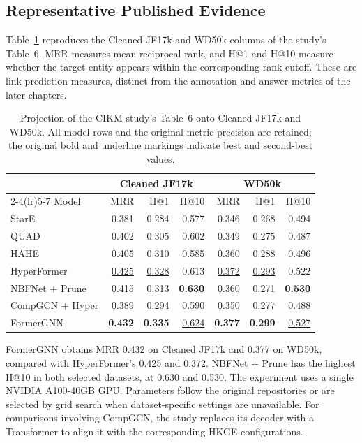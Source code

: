 \subsection{Representative Published Evidence}

Table~\ref{tab:background:formergnn} reproduces the Cleaned JF17k and WD50k columns of the study's Table~6. MRR measures mean reciprocal rank, and H@1 and H@10 measure whether the target entity appears within the corresponding rank cutoff. These are link-prediction measures, distinct from the annotation and answer metrics of the later chapters.

\begin{table}[tbp]
\centering
\caption{Projection of the CIKM study's Table~6 onto Cleaned JF17k and WD50k. All model rows and the original metric precision are retained; the original bold and underline markings indicate best and second-best values.}
\label{tab:background:formergnn}
\small
\begin{tabular}{lrrrrrr}
\toprule
&\multicolumn{3}{c}{Cleaned JF17k}&\multicolumn{3}{c}{WD50k}\\
\cmidrule(lr){2-4}\cmidrule(lr){5-7}
Model&MRR&H@1&H@10&MRR&H@1&H@10\\
\midrule
StarE&0.381&0.284&0.577&0.346&0.268&0.494\\
QUAD&0.402&0.305&0.602&0.349&0.275&0.487\\
HAHE&0.405&0.310&0.585&0.360&0.288&0.496\\
HyperFormer&\underline{0.425}&\underline{0.328}&0.613&\underline{0.372}&\underline{0.293}&0.522\\
NBFNet + Prune&0.415&0.313&\textbf{0.630}&0.360&0.271&\textbf{0.530}\\
CompGCN + Hyper&0.389&0.294&0.590&0.350&0.277&0.488\\
FormerGNN&\textbf{0.432}&\textbf{0.335}&\underline{0.624}&\textbf{0.377}&\textbf{0.299}&\underline{0.527}\\
\bottomrule
\end{tabular}
\end{table}

FormerGNN obtains MRR 0.432 on Cleaned JF17k and 0.377 on WD50k, compared with HyperFormer's 0.425 and 0.372. NBFNet + Prune has the highest H@10 in both selected datasets, at 0.630 and 0.530. The experiment uses a single NVIDIA A100-40GB GPU. Parameters follow the original repositories or are selected by grid search when dataset-specific settings are unavailable. For comparisons involving CompGCN, the study replaces its decoder with a Transformer to align it with the corresponding HKGE configurations.

